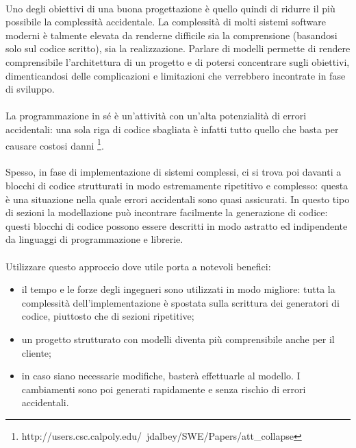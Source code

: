 \documentclass[a4paper, 12pt]{report}
\begin{document}
      \paragraph*{}
      Uno degli obiettivi di una buona progettazione è quello quindi di ridurre il più possibile la complessità accidentale.
      La complessità di molti sistemi software moderni è talmente elevata da renderne difficile sia la comprensione (basandosi solo sul codice scritto), sia la realizzazione.
      Parlare di modelli permette di rendere comprensibile l'architettura di un progetto e di potersi concentrare sugli obiettivi, dimenticandosi delle complicazioni e limitazioni che verrebbero incontrate in fase di sviluppo.
      \paragraph*{}
      La programmazione in sé è un'attività con un'alta potenzialità di errori accidentali: una sola riga di codice sbagliata è infatti tutto quello che basta per causare costosi danni \footnote{http://users.csc.calpoly.edu/~jdalbey/SWE/Papers/att_collapse}.
      \paragraph*{}
      Spesso, in fase di implementazione di sistemi complessi, ci si trova poi davanti a blocchi di codice strutturati in modo estremamente ripetitivo e complesso: questa è una situazione nella quale errori accidentali sono quasi assicurati.
      In questo tipo di sezioni la modellazione può incontrare facilmente la generazione di codice: questi blocchi di codice possono essere descritti in modo astratto ed indipendente da linguaggi di programmazione e librerie.
      \paragraph*{}
      Utilizzare questo approccio dove utile porta a notevoli benefici:
      \begin{itemize}
        \item il tempo e le forze degli ingegneri sono utilizzati in modo migliore: tutta la complessità dell'implementazione è spostata sulla scrittura dei generatori di codice, piuttosto che di sezioni ripetitive;
        \item un progetto strutturato con modelli diventa più comprensibile anche per il cliente;
        \item in caso siano necessarie modifiche, basterà effettuarle al modello. I cambiamenti sono poi generati rapidamente e senza rischio di errori accidentali.
      \end{itemize}
\end{document}
